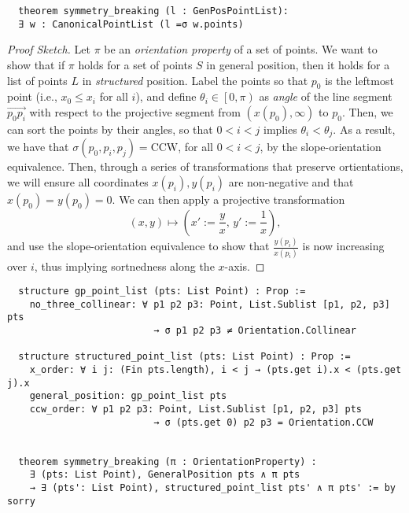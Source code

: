 \begin{lstlisting}
  theorem symmetry_breaking (l : GenPosPointList):
  ∃ w : CanonicalPointList (l =σ w.points)
\end{lstlisting}
  

\begin{proof}[Proof Sketch]
Let $\pi$ be an \emph{orientation property} of a set of points. We want to show that if $\pi$ holds for a set of points $S$ in general position, then it holds for a list of points $L$ in \emph{structured} position.    
Label the points so that $p_0$ is the leftmost point (i.e., $x_0 \leq x_i$ for all $i$), and define $\theta_i \in \left[0, \pi\right)$ as \emph{angle} of the line segment $\vec{p_0p_i}$ with respect to the projective segment from $(x(p_0), \infty)$ to $p_0$. 
Then, we can sort the points by their angles, so that $0 < i < j$ implies $\theta_i < \theta_j$.
As a result, we have that $\sigma(p_0, p_i, p_j) = \text{CCW}$, for all $0 < i < j$, by the slope-orientation equivalence. Then, through a series of transformations that preserve ortientations, we will ensure all coordinates $x(p_i), y(p_i)$ are non-negative and that $x(p_0) = y(p_0) = 0$. We can then apply a projective transformation 
\[
    (x, y) \mapsto \left(x' := \frac{y}{x}, \, y' := \frac{1}{x}\right),   
\]
and use the slope-orientation equivalence to show that  $\frac{y(p_i)}{x(p_i)}$ is now increasing over $i$, thus implying sortnedness along the $x$-axis. 

\end{proof}


\begin{lstlisting}
  structure gp_point_list (pts: List Point) : Prop :=
    no_three_collinear: ∀ p1 p2 p3: Point, List.Sublist [p1, p2, p3] pts
                          → σ p1 p2 p3 ≠ Orientation.Collinear
  
  structure structured_point_list (pts: List Point) : Prop :=
    x_order: ∀ i j: (Fin pts.length), i < j → (pts.get i).x < (pts.get j).x
    general_position: gp_point_list pts
    ccw_order: ∀ p1 p2 p3: Point, List.Sublist [p1, p2, p3] pts
                          → σ (pts.get 0) p2 p3 = Orientation.CCW


  theorem symmetry_breaking (π : OrientationProperty) :
    ∃ (pts: List Point), GeneralPosition pts ∧ π pts
    → ∃ (pts': List Point), structured_point_list pts' ∧ π pts' := by sorry


\end{lstlisting}